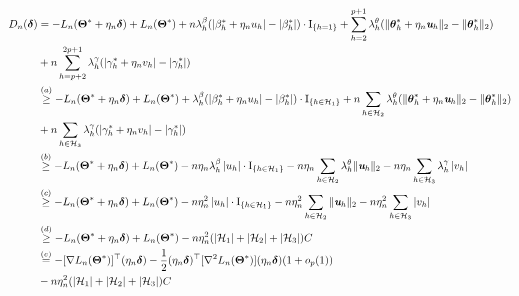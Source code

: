 \documentclass[12pt,letter]{article}\usepackage[]{graphicx}\usepackage[]{color}
\newcommand{\btheta}{\boldsymbol{\theta}}
\newcommand{\bThetastar}{\boldsymbol{\Theta}^{*}}
\newcommand{\bdelta}{\boldsymbol{\delta}}
\begin{document}
\begin{align}
D_{n}(\bdelta) & =-L_{n}(\bThetastar+\eta_{n}\bdelta)+L_{n}(\bThetastar)  + n \lambda_{h}^{\beta}(\left|\beta_{h}^*+\eta_n u_h\right| - |\beta_h^*|) \cdot \textrm{I}_{\lbrace h=1 \rbrace} +  \sum_{h=2}^{p+1}  \lambda_{h}^{\theta} (\| \btheta_{h}^* + \eta_{n}\textit{\textbf{u}}_h\|_{2} - \|\btheta_{h}^* \|_2 ) \nonumber\\  
& +n\sum_{h=p+2}^{2p+1}\lambda_{h}^{\gamma}( \left|\gamma_{h}^* + \eta_{n}v_h\right| -        \left|\gamma_{h}^*\right|) \nonumber\\
%
 & \overset{(a)}{\geq} -L_{n}(\bThetastar+\eta_{n}\bdelta)+L_{n}(\bThetastar)  
 +   \lambda_{h}^{\beta}(\left|\beta_{h}^*+\eta_n u_h\right| - |\beta_h^*|) \cdot \textrm{I}_{\lbrace h \in \mathcal{H}_1 \rbrace} +  n \sum_{h \in \mathcal{H}_2} \lambda_{h}^{\theta} (\| \btheta_{h}^* + \eta_{n}\textit{\textbf{u}}_h\|_{2} - \|\btheta_{h}^* \|_2 ) \nonumber\\  
& +n\sum_{h \in \mathcal{H}_3}\lambda_{h}^{\gamma}( \left|\gamma_{h}^* + \eta_{n}v_h\right| -        \left|\gamma_{h}^*\right|)\nonumber \\
%
 & \overset{(b)}{\geq} -L_{n}(\bThetastar+\eta_{n}\bdelta)+L_{n}(\bThetastar)  - n \eta_{n}  \lambda_{h}^{\beta}\left|u_h\right| \cdot \textrm{I}_{\lbrace h \in \mathcal{H}_1 \rbrace}  -      n \eta_{n}\sum_{h \in \mathcal{H}_2}     \lambda_{h}^{\theta} \| \textit{\textbf{u}}_h\|_{2} - n \eta_n \sum_{h \in \mathcal{H}_3}\lambda_{h}^{\gamma} \left|v_h\right| \nonumber \\
%
%
 & \overset{(c)}{\geq} -L_{n}(\bThetastar+\eta_{n}\bdelta)+L_{n}(\bThetastar)  - n \eta_{n}^2  \left|u_h\right| \cdot \textrm{I}_{\lbrace h \in \mathcal{H}_1 \rbrace}  -      n \eta_{n}^2 \sum_{h \in \mathcal{H}_2}    \| \textit{\textbf{u}}_h\|_{2} - n \eta_n^2 \sum_{h \in \mathcal{H}_3} \left|v_h\right| \nonumber \\
%
%
& \overset{(d)}{\geq} -L_{n}(\bThetastar+\eta_{n}\bdelta)+L_{n}(\bThetastar) - n \eta_{n}^2 ( |\mathcal{H}_1| + |\mathcal{H}_2| + |\mathcal{H}_3|) C \nonumber \\
%
& \overset{(e)}{=}-[\nabla L_{n}(\bThetastar)]^{\top}(\eta_{n}\bdelta)-\frac{1}{2}(\eta_{n}\bdelta)^{\top}[\nabla^{2}L_{n}(\bThetastar)](\eta_{n}\bdelta)(1+o_{p}(1)) \nonumber \\ 
& - n \eta_{n}^2 ( |\mathcal{H}_1| + |\mathcal{H}_2|+ |\mathcal{H}_3| ) C \label{eq:lemma1}
\end{align}
\end{document}
